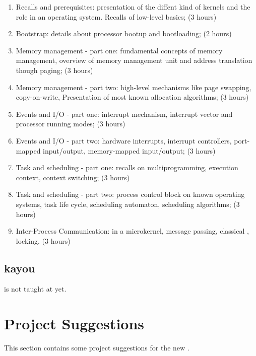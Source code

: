 \begin{multicols}{2}
\begin{enumerate}
  \item
    Recalls and prerequisites: presentation of the diffent kind of kernels
    and the role in an operating system. Recalls of low-level basics; (3 hours)
  \item
    Bootstrap: details about processor bootup and bootloading; (2 hours)
  \item
    Memory management - part one: fundamental concepts of memory management,
    overview of memory management unit and address translation though paging;
    (3 hours)
  \item
    Memory management - part two: high-level mechanisms like page swapping,
    copy-on-write, \etc{} Presentation of most known allocation algorithms;
    (3 hours)
  \item
    Events and I/O - part one: interrupt mechanism, interrupt vector and
    processor running modes; (3 hours)
  \item
    Events and I/O - part two: hardware interrupts, interrupt controllers,
    port-mapped input/output, memory-mapped input/output; (3 hours)
  \item
    Task and scheduling - part one: recalls on multiprogramming, execution
    context, context switching; (3 hours)
  \item
    Task and scheduling - part two: process control block on known operating
    systems, task life cycle, scheduling automaton, scheduling algorithms;
    (3 hours)
  \item
    Inter-Process Communication:  in a microkernel, message
    passing, classical , locking. (3 hours)
\end{enumerate}

%
%

\subsection{kayou}

 is not taught at  yet.

%
%

\section{Project Suggestions}

This section contains some project suggestions for the new .


\end{multicols}
